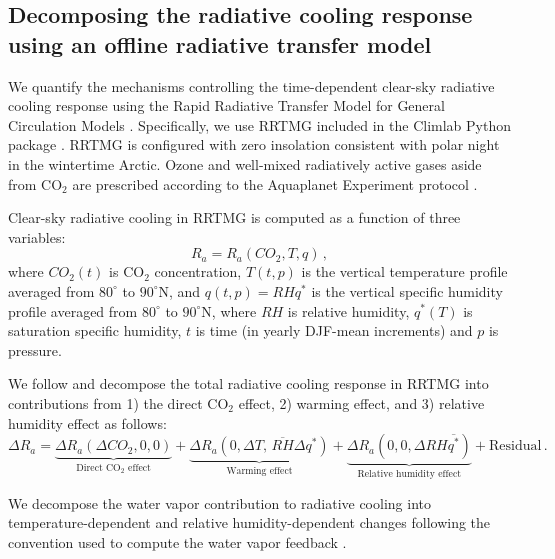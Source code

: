\documentclass[draft]{agujournal2019}
\begin{document}
\subsection{Decomposing the radiative cooling response using an offline radiative transfer model}
We quantify the mechanisms controlling the time-dependent clear-sky radiative cooling response using the Rapid Radiative Transfer Model for General Circulation Models \cite<RRTMG,>[]{mlawer1997,price2014}. Specifically, we use RRTMG included in the Climlab Python package \cite{rose2018}. RRTMG is configured with zero insolation consistent with polar night in the wintertime Arctic. Ozone and well-mixed radiatively active gases aside from CO$_2$ are prescribed according to the Aquaplanet Experiment protocol \cite{blackburn2013}. %

Clear-sky radiative cooling in RRTMG is computed as a function of three variables:
\begin{equation}
    R_a = R_a(CO_2, T, q)\, ,
\end{equation}
where $CO_2(t)$ is CO$_2$ concentration, $T(t,p)$ is the vertical temperature profile averaged from $80^\circ$ to $90^\circ$N, and $q(t,p)=RHq^\ast$ is the vertical specific humidity profile averaged from $80^\circ$ to $90^\circ$N, where $RH$ is relative humidity, $q^\ast(T)$ is saturation specific humidity, $t$ is time (in yearly DJF-mean increments) and $p$ is pressure.

We follow  and decompose the total radiative cooling response in RRTMG into contributions from 1) the direct CO$_2$ effect, 2) warming effect, and 3) relative humidity effect as follows:
\begin{equation} \label{eq:dra-di}
    \Delta R_{a} = \underbrace{\Delta R_{a}(\Delta CO_2, 0,0)}_{\text{Direct CO}_2\text{ effect}} + \underbrace{\Delta R_{a}(0,\Delta T,\,\overline{RH}\Delta q^\ast)}_{\text{Warming effect}} + \underbrace{\Delta R_a(0,0,\Delta RH \overline{q^\ast})}_{\text{Relative humidity effect}} + \mathrm{ Residual} \, .
\end{equation}

We decompose the water vapor contribution to radiative cooling into temperature-dependent and relative humidity-dependent changes following the convention used to compute the water vapor feedback \cite{held2012,ingram2013,jeevanjee2021}.
\end{document}
